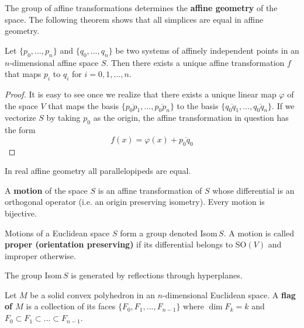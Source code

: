 \documentclass{article}
\begin{document}
    The group of affine transformations determines the \textbf{affine geometry} of the space. The following theorem shows that all simplices are equal in affine geometry. 

    \begin{theorem}
      Let $\{p_0, ..., p_n\}$ and $\{q_0, ..., q_n\}$ be two systems of affinely independent points in an $n$-dimensional affine space $S$. Then there exists a unique affine transformation $f$ that maps $p_i$ to $q_i$ for $i = 0, 1, ..., n$. 
    \end{theorem}
    \begin{proof}
      It is easy to see once we realize that there exists a unique linear map $\varphi$ of the space $V$ that maps the basis $\{\overline{p_0 p_1}, ..., \overline{p_0 p_n}\}$ to the basis $\{\overline{q_0 q_1}, ..., \overline{q_0 q_n}\}$. If we vectorize $S$ by taking $p_0$ as the origin, the affine transformation in question has the form 
      \begin{equation}
        f(x) = \varphi(x) + \overline{p_0 q_0}
      \end{equation}
    \end{proof}

    \begin{corollary}
      In real affine geometry all parallelopipeds are equal. 
    \end{corollary}

    \begin{definition}
      A \textbf{motion} of the space $S$ is an affine transformation of $S$ whose differential is an orthogonal operator (i.e. an origin preserving isometry). Every motion is bijective. 
    \end{definition}

    Motions of a Euclidean space $S$ form a group denoted Isom$\,S$. A motion is called \textbf{proper (orientation preserving)} if its differential belongs to SO$(V)$ and improper otherwise. 

    \begin{lemma}
      The group Isom$\,S$ is generated by reflections through hyperplanes. 
    \end{lemma}

    \begin{definition}
      Let $M$ be a solid convex polyhedron in an $n$-dimensional Euclidean space. A \textbf{flag of $M$} is a collection of its faces $\{F_0, F_1, ..., F_{n-1}\}$ where $\dim{F_k} = k$ and $F_0 \subset F_1 \subset ... \subset F_{n-1}$. 
    \end{definition}
\end{document}

